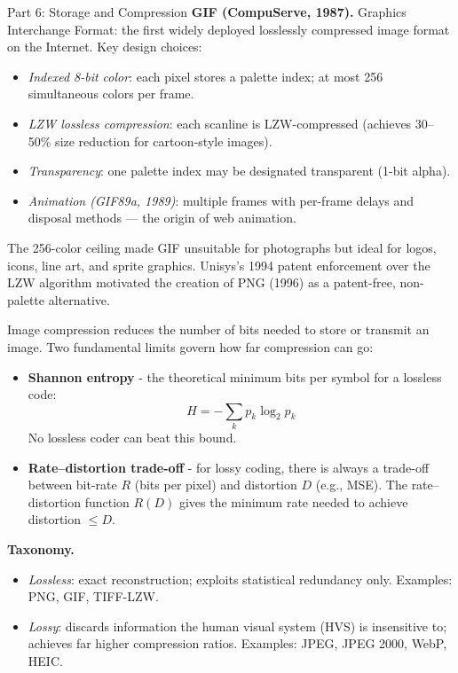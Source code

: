 \documentclass[letterpaper]{article}
\begin{document}
\begin{notes}{Part 6: Storage and Compression}
\textbf{GIF (CompuServe, 1987).} Graphics Interchange Format: the first widely deployed losslessly compressed image format on the Internet. Key design choices:
\begin{itemize}
    \item \emph{Indexed 8-bit color}: each pixel stores a palette index; at most 256 simultaneous colors per frame.
    \item \emph{LZW lossless compression}: each scanline is LZW-compressed (achieves 30--50\% size reduction for cartoon-style images).
    \item \emph{Transparency}: one palette index may be designated transparent (1-bit alpha).
    \item \emph{Animation (GIF89a, 1989)}: multiple frames with per-frame delays and disposal methods --- the origin of web animation.
\end{itemize}
The 256-color ceiling made GIF unsuitable for photographs but ideal for logos, icons, line art, and sprite graphics. Unisys's 1994 patent enforcement over the LZW algorithm motivated the creation of PNG (1996) as a patent-free, non-palette alternative.


\columnbreaknofill





Image compression reduces the number of bits needed to store or transmit an image. Two fundamental limits govern how far compression can go:
\begin{itemize}
    \item \textbf{Shannon entropy} - the theoretical minimum bits per symbol for a lossless code: 
    $$H = -\sum_k p_k \log_2 p_k$$
    No lossless coder can beat this bound.
    \item \textbf{Rate--distortion trade-off} - for lossy coding, there is always a trade-off between bit-rate $R$ (bits per pixel) and distortion $D$ (e.g., MSE). The rate--distortion function $R(D)$ gives the minimum rate needed to achieve distortion $\le D$.
\end{itemize}

\textbf{Taxonomy.}
\begin{itemize}
    \item \emph{Lossless}: exact reconstruction; exploits statistical redundancy only. Examples: PNG, GIF, TIFF-LZW.
    \item \emph{Lossy}: discards information the human visual system (HVS) is insensitive to; achieves far higher compression ratios. Examples: JPEG, JPEG 2000, WebP, HEIC.
\end{itemize}


\end{notes}
\end{document}
